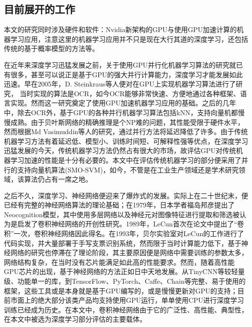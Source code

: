 \subsection{目前展开的工作}
\par 本文的研究同时涉及硬件和软件：Nvidia新架构的GPU与使用GPU加速计算的机器学习应用，注意这里的机器学习应用并不只是现在大行其道的深度学习，还包括传统的基于概率模型的方法等。
\par 在近年来深度学习迅猛发展之前，关于使用GPU并行化机器学习算法的研究就已有很多，甚至可以说正是基于GPU的强大并行计算能力，深度学习才能发展如此迅速。早在2005年，D. Steinkraus等人便对在GPU上实现机器学习算法进行了研究， 当时实现的算法是OCR，如今OCR能够非常快速、方便地通过各种框架、语言实现。然而这一研究奠定了使用GPU加速机器学习应用的基础\parencite{GPUFORML}。之后的几年中，除去OCR外，基于GPU的各种并行机器学习算法包括kNN\parencite{KNNG}，支持向量机\parencite{SMOSVM}都慢慢成熟。由于贝叶斯网络的精确推理是个NP难的问题，其性能受限于硬件水平，然而根据Md Vasimuddin等人的研究\parencite{BAYESINF}，通过并行方法将延迟降低了许多。由于传统机器学习方法有着延迟低、模型小、训练时间短、可解释性强等优点，在深度学习迅猛发展的今天，传统机器学习方法仍然占有很大的市场，故评估GPU对传统机器学习加速的性能是十分有必要的。本文中在评估传统机器学习的部分便采用了并行的支持向量机算法(SMO-SVM)，如今，不管是在工业生产领域还是学术研究领域，该算法仍占有一席之地。
\par 之后不久，深度学习、神经网络便迎来了爆炸式的发展。实际上在二十世纪末，便已经有完整的神经网络算法的理论基础；在1979年，日本学者福岛邦彦提出了Neocognition模型，其中使用多层网络以及神经元对图像特征进行提取和筛选被认为是启发了卷积神经网络的开创性研究\parencite{JAPANESSAY}。1989年，LeCun首次在论文中提出了“卷积”一次，卷积神经网络因此得名\parencite{LENET}。在1993年，贝尔实验室对LeCun的工作进行了代码实现，并大量部署于手写支票识别系统，然而限于当时计算能力低下，基于神经网络的研究也停滞在了理论阶段，其主要原因便是网络中需要训练的参数太多，网络结构复杂，在当时没有芯片能满足如此高的性能要求\parencite{NNML}。然而，随着高性能GPU芯片的出现，基于神经网络的方法正如日中天地发展。从TinyCNN等较轻量级、功能单一的库，到TensorFlow、PyTorch、Caffe、Chain等完整、易于使用的框架，这些工具或是本身就是基于GPU编写的，或是慢慢更新对GPU的支持；目前市面上的绝大部分该类产品均支持使用GPU运行，单单使用CPU进行深度学习训练已经成为历史。在本文中，卷积神经网络由于它的广泛性、高性能、典型性，在本文中被选为深度学习部分评估的主要载体。
